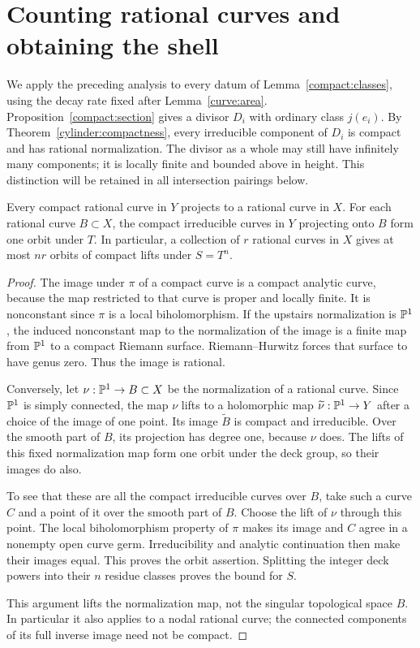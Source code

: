 \section{Counting rational curves and obtaining the shell}
\label{sec:conclusion}

We apply the preceding analysis to every datum of
Lemma~\ref{compact:classes}, using the decay rate fixed after
Lemma~\ref{curve:area}. Proposition~\ref{compact:section} gives a divisor
$D_i$ with ordinary class $j(e_i)$. By
Theorem~\ref{cylinder:compactness}, every irreducible component of
$D_i$ is compact and has rational normalization. The divisor as a whole
may still have infinitely many components; it is locally finite and
bounded above in height. This distinction will be retained in all
intersection pairings below.

\begin{lemma}\label{conclusion:lifts}
Every compact rational curve in $Y$ projects to a rational curve in $X$.
For each rational curve $B\subset X$, the compact irreducible curves in
$Y$ projecting onto $B$ form one orbit under $T$. In particular, a
collection of $r$ rational curves in $X$ gives at most $nr$ orbits of
compact lifts under $S=T^n$.
\end{lemma}

\begin{proof}
The image under $\pi$ of a compact curve is a compact analytic curve,
because the map restricted to that curve is proper and locally finite.
It is nonconstant since $\pi$ is a local biholomorphism. If the upstairs
normalization is $\mathbb P^1$, the induced nonconstant map to the normalization
of the image is a finite map from $\mathbb P^1$ to a compact Riemann surface.
Riemann--Hurwitz forces that surface to have genus zero. Thus the image
is rational.

Conversely, let $\nu:\mathbb P^1\to B\subset X$ be the normalization of a
rational curve. Since $\mathbb P^1$ is simply connected, the map $\nu$ lifts
to a holomorphic map $\widetilde\nu:\mathbb P^1\to Y$ after a choice of the
image of one point. Its image $\widetilde B$ is compact and irreducible.
Over the smooth part of $B$, its projection has degree one, because
$\nu$ does. The lifts of this fixed normalization map form one orbit
under the deck group, so their images do also.

To see that these are all the compact irreducible curves over $B$, take
such a curve $C$ and a point of it over the smooth part of $B$.
Choose the lift of $\nu$ through this point. The local biholomorphism
property of $\pi$ makes its image and $C$ agree in a nonempty open
curve germ. Irreducibility and analytic continuation then make their
images equal. This proves the orbit assertion. Splitting the integer
deck powers into their $n$ residue classes proves the bound for $S$.

This argument lifts the normalization map, not the singular topological
space $B$. In particular it also applies to a nodal rational curve;
the connected components of its full inverse image need not be compact.
\end{proof}


